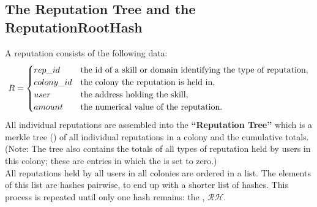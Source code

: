 \subsection{The Reputation Tree and the ReputationRootHash}\label{sec:reptree}
A reputation consists of the following data:
$$
R = 
\begin{cases}
 rep\_id & \textnormal{the id of a skill or domain identifying the type of reputation},\\
 colony\_id & \textnormal{the colony the reputation is held in},\\
 user & \textnormal{the address holding the skill},\\
 amount & \textnormal{the numerical value of the reputation}.
\end{cases}
$$
All individual reputations are assembled into the \textbf{``Reputation Tree''} which is a merkle tree (\cite{MerkleTrees}) of all individual reputations in a colony and the cumulative totals. (Note: The tree also contains the totals of all types of reputation held by users in this colony; these are entries in which the  is set to zero.)\\
All reputations held by all users in all colonies are ordered in a list. The elements of this list are hashes pairwise, to end up with a shorter list of hashes. This process is repeated until only one hash remains: the , $\mathcal{RH}$.
\begin{center}
\end{center}

